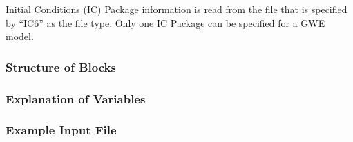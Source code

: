 Initial Conditions (IC) Package information is read from the file that is specified by ``IC6'' as the file type.  Only one IC Package can be specified for a GWE model. 

\vspace{5mm}
\subsubsection{Structure of Blocks}
%


\vspace{5mm}
\subsubsection{Explanation of Variables}
\begin{description}

\end{description}

\vspace{5mm}
\subsubsection{Example Input File}


